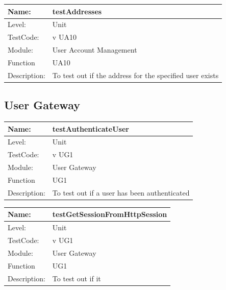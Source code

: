\documentclass[12pt]{article}
\begin{document}
\begin{flushleft}
\begin{center}
\begin{tabular}{|l|p{12cm}|}
\end{tabular}
\end{center}

\begin{center}
\begin{tabular}{|l|p{12cm}|}
\hline

 Name: & testAddresses\\
\hline
Level: & Unit \\
\hline
TestCode: & v UA10 \\
\hline
Module:& User Account Management\\
\hline
Function & UA10 \\
\hline
Description: & To test out if the address for the specified user exists \\
\hline

\end{tabular}
\end{center}

\subsection{User Gateway}
\begin{center}
\begin{tabular}{|l|p{12cm}|}
\hline

 Name: & testAuthenticateUser \\
\hline
Level: & Unit \\
\hline
TestCode: & v UG1 \\
\hline
Module:& User Gateway\\
\hline
Function & UG1 \\
\hline
Description: & To test out if a user has been authenticated \\
\hline

\end{tabular}
\end{center}

\begin{center}
\begin{tabular}{|l|p{12cm}|}
\hline

 Name: & testGetSessionFromHttpSession \\
\hline
Level: & Unit \\
\hline
TestCode: & v UG1 \\
\hline
Module:& User Gateway\\
\hline
Function & UG1 \\
\hline
Description: & To test out if it  \\
\hline


\end{tabular}
\end{center}
\end{flushleft}
\end{document}

